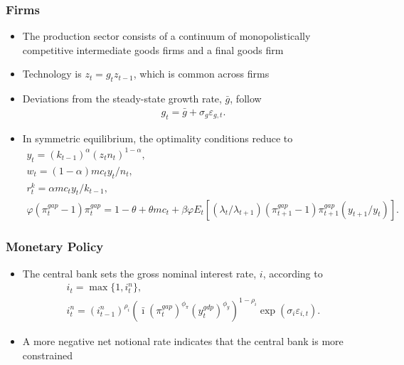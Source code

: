 \documentclass[11pt]{beamer}
\begin{document}
\begin{frame}\frametitle{Firms}
\begin{itemize}\setlength{\itemsep}{8pt}
\item The production sector consists of a continuum of monopolistically competitive intermediate goods firms and a final goods firm 
\item Technology is $z_t = g_tz_{t-1}$, which is common across firms
\item Deviations from the steady-state growth rate, $\bar{g}$, follow
\begin{gather*}
  g_t = \bar{g} + \sigma_g\varepsilon_{g,t}.
\end{gather*}
\item In symmetric equilibrium, the optimality conditions reduce to
\scriptsize
\begin{gather*}
  y_t = (k_{t-1})^\alpha(z_tn_t)^{1-\alpha},\\
  w_t = (1-\alpha)mc_ty_t/n_t,\\
  r_t^k = \alpha mc_t y_t/k_{t-1},\\
  \varphi(\pi_t^{gap}-1)\pi_t^{gap} = 1-\theta + \theta mc_t + \beta\varphi E_t[(\lambda_t/\lambda_{t+1})(\pi_{t+1}^{gap}-1)\pi_{t+1}^{gap}(y_{t+1}/y_t)].
\end{gather*}
\normalfont
\end{itemize}
\end{frame}
\begin{frame}\frametitle{Monetary Policy}
\begin{itemize} \setlength{\itemsep}{14pt}
\item
The central bank sets the gross nominal interest rate, $i$, according to
\begin{gather*}
    i_t=\max\{1,i_t^n\},\\
  i_t^n=(i^n_{t-1})^{\rho_i}(\bar{\imath}(\pi^{gap}_t)^{\phi_\pi}(y^{gdp}_{t})^{\phi_y})^{1-\rho_i}\exp(\sigma_i\varepsilon_{i,t}). 
\end{gather*}
\item A more negative net notional rate indicates that the central bank is more constrained
\end{itemize}
\end{frame}
\end{document}

